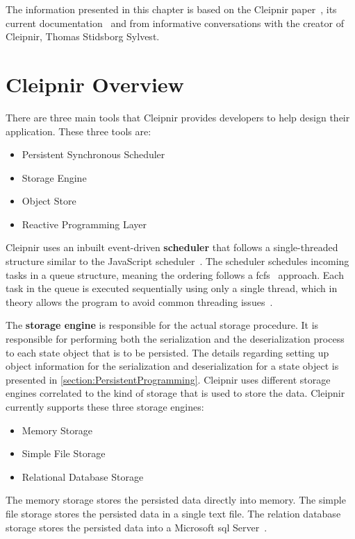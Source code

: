 The information presented in this chapter is based on the Cleipnir paper~\cite{PAPER:PaxosCleipnir}, its current documentation~\cite{DOC:Cleipnir} and from informative conversations with the creator of Cleipnir, Thomas Stidsborg Sylvest.

\section{Cleipnir Overview}
\label{section:CleipnirOv}
There are three main tools that Cleipnir provides developers to help design their application.
These three tools are:
\begin{itemize}
	\item{Persistent Synchronous Scheduler}
	\item{Storage Engine}
	\item{Object Store}
	\item{Reactive Programming Layer}
\end{itemize}
Cleipnir uses an inbuilt event-driven \textbf{scheduler} that follows a single-threaded structure similar to the JavaScript scheduler~\cites{WEB:CleipnirScheduler}[p.~7]{PAPER:PaxosCleipnir}. The scheduler schedules incoming tasks in a queue structure, meaning the ordering follows a \ac{fcfs}~\cite{WEB:FIFO} approach. Each task in the queue is executed sequentially using only a single thread, which in theory allows the program to avoid common threading issues~\cite[p.~7]{PAPER:PaxosCleipnir}.

The \textbf{storage engine} is responsible for the actual storage procedure. It is responsible for performing both the serialization and the deserialization process to each state object that is to be persisted. The details regarding setting up object information for the serialization and deserialization for a state object is presented in \autoref{section:PersistentProgramming}. Cleipnir uses different storage engines correlated to the kind of storage that is used to store the data. Cleipnir currently supports these three storage engines:
\begin{itemize}
	\item{Memory Storage}
	\item{Simple File Storage}
	\item{Relational Database Storage}
\end{itemize}
\cites[p.~10,12]{PAPER:PaxosCleipnir}

The memory storage stores the persisted data directly into memory.
The simple file storage stores the persisted data in a single text file.
The relation database storage stores the persisted data into a Microsoft \acs{sql} Server~\cites{WEB:MSSQL}[p~10-12]{PAPER:PaxosCleipnir}.

